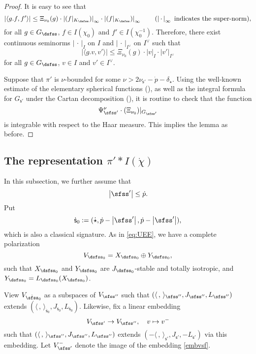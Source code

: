 \documentclass[12pt,a4paper]{amsart}
\def\abs#1{\left|{#1}\right|}
\newcommand{\la}{\langle}
\newcommand{\ra}{\rangle}
\newcommand{\be}{\begin {equation}}
\newcommand{\ee}{\end {equation}}
\numberwithin{equation}{section}
\theoremstyle{remark}
\begin{document}
\begin{proof}
 It is easy to see that
 \[
   \abs{\la g.f, f'\ra}\leq  \Xi_{\nu_0}(g)\cdot \abs{(f|_{K_\dsfss})}_\infty \cdot  \abs{(f|_{K_\dsfss})}_\infty \qquad(\abs{\,\cdot \,}_\infty \textrm{ indicates the super-norm}),
 \]
 for all $g\in G_\dsfss$, $f\in I(\chi_0)$ and $f'\in I(\chi_0^{-1})$. Therefore, there exist continuous seminorms $\abs{\,\cdot\, }_I$ on $I$ and $\abs{\,\cdot\,}_{I^\vee}$ on $I^\vee$ such that
 \[
   \abs{\la g.v, v' \ra}\leq  \Xi_{\nu_0}(g)\cdot \abs{v}_I \cdot  \abs{v'}_{I^\vee}
 \]
 for all $g\in G_\dsfss$, $v\in I$ and $v'\in I^\vee$.

 Suppose that $\pi'$ is $\nu$-bounded for some
$\nu>2\nu_{\mathsf s'}-\dot p-\delta_{\dot \star} $.
Using the well-known estimate of the elementary spherical functions (\cite[Theorem 4.5.3 and Lemma 3.6.7]{Wa1}), as well as the integral formula for $G_{\mathsf s'}$ under the Cartan decomposition (\cite[Lemma 2.4.2]{Wa1}), it is routine to check that
the function
\[
  \Psi_{\sfss'}^\nu\cdot (\Xi_{\nu_0})|_{G_{\sfss'}}
\]
is integrable with respect to the Haar measure. This implies the lemma as before.
\end{proof}

\subsection{The representation $\pi'* I(\dot{\chi})$}

In this subsection, we further assume that
\[
  \abs{\sfss'}\leq \dot p.
\]
Put
\[
  \dot{ \mathsf s}_0:=(\dot \star, \dot p-\abs{\sfss'}, \dot p-\abs{\sfss'}),
\]
which is also a classical signature. As in \eqref{eq:UEE},
 we have a complete polarization
\begin{equation}\label{eq:UEE22}
  V_{\dsfss_0}=X_{\dsfss_0}\oplus Y_{\dsfss_0},
\end{equation}
such that $X_{\dsfss_0}$ and $Y_{\dsfss_0}$ are $J_{\dsfss_0}$-stable and totally isotropic, and  $Y_{\dsfss_0}=L_{\dsfss_0}(X_{\dsfss_0})$.

View $V_{{\dot \sfss}_0}$  as a subspaces of $V_{\sfss''}$ such that $(\la\,,\,\ra_{\sfss''}, J_{\sfss''},L_{\sfss''})$  extends   $(\la\,,\,\ra_{\dot{ \mathsf s}_0}, J_{\dot{ \mathsf s}_0}, L_{\dot{ \mathsf s}_0})$. Likewise,
 fix a linear embedding
\be\label{embvsf}
  V_{\sfss'}\rightarrow V_{\sfss''}, \quad v\mapsto v^-
\ee
such that $(\la\,,\,\ra_{\sfss''}, J_{\sfss''},L_{\sfss''})$  extends  $(-\la\,,\,\ra_{\mathsf s'}, J_{\mathsf s'}, -L_{\mathsf s'})$ via this  embedding.
Let $V_{\sfss'}^-$ denote the image of the   embedding \eqref{embvsf}.
\end{document}
